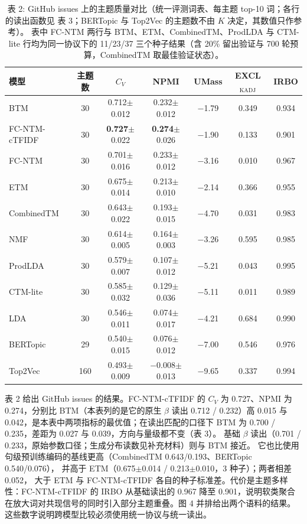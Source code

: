 \documentclass{article}
\begin{document}
\begin{table}[t]
\centering
\caption{表 2: GitHub issues 上的主题质量对比（统一评测词表、每主题 top-10 词；各行的读出函数见
表 3；BERTopic 与 Top2Vec 的主题数不由 $K$ 决定，其数值只作参考）。
表中 FC-NTM 两行与 BTM、ETM、CombinedTM、ProdLDA 与 CTM-lite 行均为同一协议下的
11/23/37 三个种子结果（含 20\% 留出验证与 700 轮预算，CombinedTM 取最佳验证状态）。}
\label{tab:github}
\small
\begin{tabular}{lcccccc}
\toprule
模型 & 主题数 & $C_V$ & NPMI & UMass & EXCL$_{\mathrm{KADJ}}$ & IRBO \\
\midrule
BTM & 30 & 0.712$\pm$0.012 & 0.232$\pm$0.012 & $-$1.79 & 0.349 & 0.934 \\
FC-NTM-cTFIDF & 30 & \textbf{0.727}$\pm$0.022 & \textbf{0.274}$\pm$0.026 & $-$1.90 & 0.133 & 0.901 \\
FC-NTM & 30 & 0.701$\pm$0.016 & 0.233$\pm$0.012 & $-$3.16 & 0.010 & 0.967 \\
ETM & 30 & 0.675$\pm$0.014 & 0.213$\pm$0.010 & $-$2.14 & 0.366 & 0.955 \\
CombinedTM & 30 & 0.643$\pm$0.022 & 0.193$\pm$0.015 & $-$4.70 & 0.031 & 0.983 \\
NMF & 30 & 0.614$\pm$0.005 & 0.164$\pm$0.003 & $-$3.26 & 0.595 & 0.985 \\
ProdLDA & 30 & 0.579$\pm$0.007 & 0.107$\pm$0.012 & $-$5.21 & 0.043 & 0.995 \\
CTM-lite & 30 & 0.585$\pm$0.032 & 0.129$\pm$0.036 & $-$5.11 & 0.011 & 0.989 \\
LDA & 30 & 0.546$\pm$0.011 & 0.074$\pm$0.017 & $-$4.21 & 0.684 & 0.990 \\
BERTopic & 29 & 0.540$\pm$0.015 & 0.076$\pm$0.012 & $-$7.00 & 0.546 & 0.976 \\
Top2Vec & 160 & 0.493$\pm$0.009 & $-$0.008$\pm$0.013 & $-$9.65 & 0.337 & 0.994 \\
\bottomrule
\end{tabular}
\end{table}

表 2 给出 GitHub issues 的结果。FC-NTM-cTFIDF 的
$C_V$ 为 0.727、NPMI 为 0.274，分别比 BTM（本表列的是它的原生 $\beta$ 读出
0.712 / 0.232）高 0.015 与 0.042，是本表中两项指标的最优值；在读出匹配的口径下 BTM
为 0.700 / 0.235，差距为 0.027 与 0.039，方向与量级都不变（表 3）。
基础 $\beta$ 读出（0.701 / 0.233，原始参数口径；生成分布读数见补充材料）则与 BTM 接近。
它也比使用句级预训练编码的基线更高（CombinedTM 0.643/0.193、BERTopic 0.540/0.076），
并高于 ETM（0.675$\pm$0.014 / 0.213$\pm$0.010，3 种子）；两者相差 0.052，
大于 ETM 与 FC-NTM-cTFIDF 各自的种子标准差。代价是主题多样性：FC-NTM-cTFIDF 的 IRBO 从基础读出的 0.967
降至 0.901，说明软类聚合在放大词对共现信号的同时引入部分主题重叠。图
4 并排给出两个语料的结果。
这些数字说明跨模型比较必须使用统一协议与统一读出。
\end{document}
